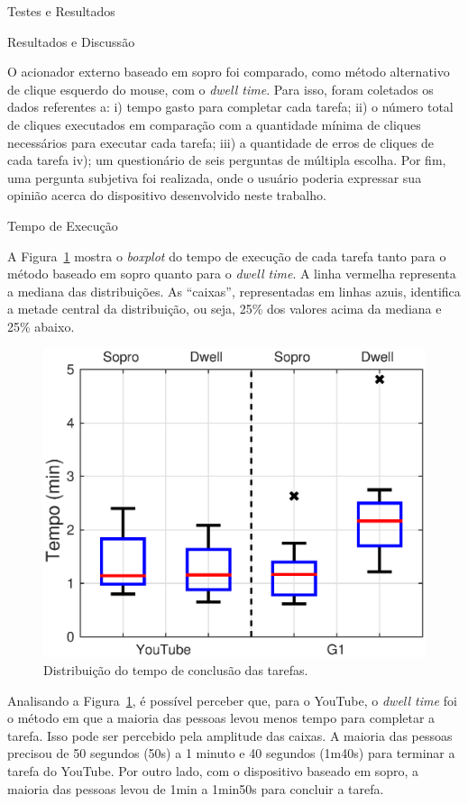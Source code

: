 \begin{chapter}{Testes e Resultados}
\begin{section}{Resultados e Discussão}

O acionador externo baseado em sopro foi comparado, como
método alternativo de clique esquerdo do mouse, com o \textit{dwell time}. Para
isso, foram coletados os dados referentes a: i) tempo gasto para completar cada
tarefa; ii) o número total de cliques executados em comparação com a quantidade
mínima de cliques necessários para executar cada tarefa; iii) a quantidade de
erros de cliques de cada tarefa iv); um questionário de seis perguntas de
múltipla escolha. Por fim, uma pergunta subjetiva foi realizada, onde o usuário
poderia expressar sua opinião acerca do dispositivo desenvolvido neste trabalho.

\begin{subsection}{Tempo de Execução}

A Figura~\ref{fig:tempo} mostra o \textit{boxplot} do tempo de execução de cada
tarefa tanto para o método baseado em sopro quanto para o \textit{dwell time}. A
linha vermelha representa a mediana das distribuições. As ``caixas'',
representadas em linhas azuis, identifica a metade central da distribuição, ou
seja, 25\% dos valores acima da mediana e 25\% abaixo.

\begin{figure}[!h]
	\centering
	\includegraphics[width=.7\linewidth]{fig/time}
	\caption{Distribuição do tempo de conclusão das tarefas.}
	\label{fig:tempo}
\end{figure}

Analisando a Figura~\ref{fig:tempo}, é possível perceber que, para o YouTube, o
\textit{dwell time} foi o método em que a maioria das pessoas levou menos tempo
para completar a tarefa. Isso pode ser percebido pela amplitude das caixas.
A maioria das pessoas precisou de 50 segundos (50s) a 1 minuto e 40 segundos
(1m40s) para terminar a tarefa do YouTube. Por outro lado, com o dispositivo
baseado em sopro, a maioria das pessoas levou de 1min a 1min50s para concluir a
tarefa.


\end{subsection}
\end{section}
\end{chapter}
